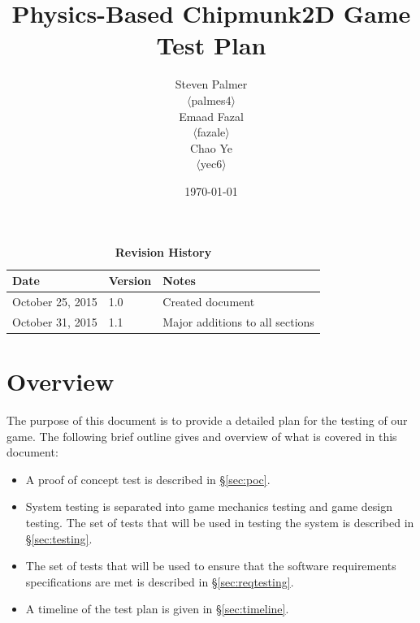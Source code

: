 \documentclass[12pt, titlepage]{article}
\begin{document}
\title{\bf Physics-Based Chipmunk2D Game\\[\baselineskip]\Large Test Plan}
\author{Steven Palmer\\$\langle$palmes4$\rangle$\\Emaad Fazal\\$\langle$fazale$\rangle$\\Chao Ye\\$\langle$yec6$\rangle$}
\date{\today}
	
\maketitle

\tableofcontents
\listoftables
\listoffigures


\begin{table}[bp]
\caption*{\bf Revision History}
\begin{tabularx}{\textwidth}{p{3.5cm}p{2cm}X}
\toprule {\bf Date} & {\bf Version} & {\bf Notes}\\
\midrule
October 25, 2015 & 1.0 & Created document\\
October 31, 2015 & 1.1 & Major additions to all sections\\
\bottomrule
\end{tabularx}
\end{table}

\newpage


\section{Overview}
The purpose of this document is to provide a detailed plan for the testing of our game.  The following brief outline gives and overview of what is covered in this document:

\begin{itemize}
  \item A proof of concept test is described in \hyperref[sec:poc]{\S\ref*{sec:poc}}.
  \item System testing is separated into game mechanics testing and game design testing.  The set of tests that will be used in testing the system is described in \hyperref[sec:testing]{\S\ref*{sec:testing}}.
  \item The set of tests that will be used to ensure that the software requirements specifications are met is described in \hyperref[sec:reqtesting]{\S\ref*{sec:reqtesting}}.
  \item A timeline of the test plan is given in \hyperref[sec:timeline]{\S\ref*{sec:timeline}}.  
\end{itemize}
\end{document}
